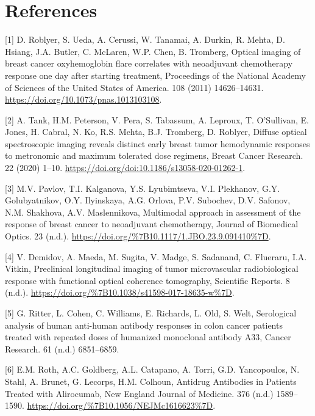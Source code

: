 \documentclass[
]{article}
\begin{document}
\hypertarget{references}{%
\section{References}\label{references}}

\hypertarget{refs}{}
\leavevmode\hypertarget{ref-roblyer2011}{}%
{[}1{]} D. Roblyer, S. Ueda, A. Cerussi, W. Tanamai, A. Durkin, R. Mehta, D. Hsiang, J.A. Butler, C. McLaren, W.P. Chen, B. Tromberg, Optical imaging of breast cancer oxyhemoglobin flare correlates with neoadjuvant chemotherapy response one day after starting treatment, Proceedings of the National Academy of Sciences of the United States of America. 108 (2011) 14626--14631. \url{https://doi.org/10.1073/pnas.1013103108}.

\leavevmode\hypertarget{ref-tank2020}{}%
{[}2{]} A. Tank, H.M. Peterson, V. Pera, S. Tabassum, A. Leproux, T. O'Sullivan, E. Jones, H. Cabral, N. Ko, R.S. Mehta, B.J. Tromberg, D. Roblyer, Diffuse optical spectroscopic imaging reveals distinct early breast tumor hemodynamic responses to metronomic and maximum tolerated dose regimens, Breast Cancer Research. 22 (2020) 1--10. \url{https://doi.org/doi:10.1186/s13058-020-01262-1}.

\leavevmode\hypertarget{ref-pavlov2018}{}%
{[}3{]} M.V. Pavlov, T.I. Kalganova, Y.S. Lyubimtseva, V.I. Plekhanov, G.Y. Golubyatnikov, O.Y. Ilyinskaya, A.G. Orlova, P.V. Subochev, D.V. Safonov, N.M. Shakhova, A.V. Maslennikova, Multimodal approach in assessment of the response of breast cancer to neoadjuvant chemotherapy, Journal of Biomedical Optics. 23 (n.d.). \url{https://doi.org/\%7B10.1117/1.JBO.23.9.091410\%7D}.

\leavevmode\hypertarget{ref-demidov2018}{}%
{[}4{]} V. Demidov, A. Maeda, M. Sugita, V. Madge, S. Sadanand, C. Flueraru, I.A. Vitkin, Preclinical longitudinal imaging of tumor microvascular radiobiological response with functional optical coherence tomography, Scientific Reports. 8 (n.d.). \url{https://doi.org/\%7B10.1038/s41598-017-18635-w\%7D}.

\leavevmode\hypertarget{ref-ritter2001}{}%
{[}5{]} G. Ritter, L. Cohen, C. Williams, E. Richards, L. Old, S. Welt, Serological analysis of human anti-human antibody responses in colon cancer patients treated with repeated doses of humanized monoclonal antibody A33, Cancer Research. 61 (n.d.) 6851--6859.

\leavevmode\hypertarget{ref-roth2017}{}%
{[}6{]} E.M. Roth, A.C. Goldberg, A.L. Catapano, A. Torri, G.D. Yancopoulos, N. Stahl, A. Brunet, G. Lecorps, H.M. Colhoun, Antidrug Antibodies in Patients Treated with Alirocumab, New England Journal of Medicine. 376 (n.d.) 1589--1590. \url{https://doi.org/\%7B10.1056/NEJMc1616623\%7D}.
\end{document}
